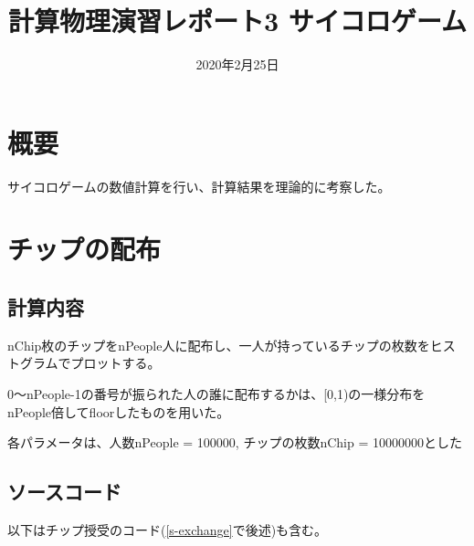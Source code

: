 \documentclass[ %
  platex,%
  papersize,%
  twocolumn,
  landscape
]{jsarticle}
\title{計算物理演習レポート3 サイコロゲーム}
\author{}
\date{2020年2月25日}
\begin{document}
\maketitle

\section{概要}
サイコロゲームの数値計算を行い、計算結果を理論的に考察した。

\section{チップの配布}\label{s-dist}
\subsection{計算内容}
nChip枚のチップをnPeople人に配布し、一人が持っているチップの枚数をヒストグラムでプロットする。

0～nPeople-1の番号が振られた人の誰に配布するかは、[0,1)の一様分布をnPeople倍してfloorしたものを用いた。

各パラメータは、人数nPeople = 100000, チップの枚数nChip = 10000000とした\\

\subsection{ソースコード}\label{dist-code}
以下はチップ授受のコード(\ref{s-exchange}で後述)も含む。
\end{document}

